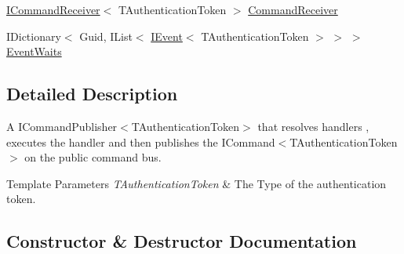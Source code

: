 \begin{DoxyCompactItemize}
\item 
\hyperlink{interfaceCqrs_1_1Commands_1_1ICommandReceiver}{I\+Command\+Receiver}$<$ T\+Authentication\+Token $>$ \hyperlink{classCqrs_1_1Akka_1_1Commands_1_1AkkaCommandBus_ac65a93dadbbb006dd815c5c54c9ecc82_ac65a93dadbbb006dd815c5c54c9ecc82}{Command\+Receiver}
\item 
I\+Dictionary$<$ Guid, I\+List$<$ \hyperlink{interfaceCqrs_1_1Events_1_1IEvent}{I\+Event}$<$ T\+Authentication\+Token $>$ $>$ $>$ \hyperlink{classCqrs_1_1Akka_1_1Commands_1_1AkkaCommandBus_af64744500f25a0b203684ef757aa7962_af64744500f25a0b203684ef757aa7962}{Event\+Waits}
\end{DoxyCompactItemize}


\subsection{Detailed Description}
A I\+Command\+Publisher$<$\+T\+Authentication\+Token$>$ that resolves handlers , executes the handler and then publishes the I\+Command$<$\+T\+Authentication\+Token$>$ on the public command bus. 


\begin{DoxyTemplParams}{Template Parameters}
{\em T\+Authentication\+Token} & The Type of the authentication token.\\
\hline
\end{DoxyTemplParams}


\subsection{Constructor \& Destructor Documentation}
\mbox{\label{classCqrs_1_1Akka_1_1Commands_1_1AkkaCommandBus_a255b78be5cb216dcd30e2d2dd1240c06_a255b78be5cb216dcd30e2d2dd1240c06}} 
